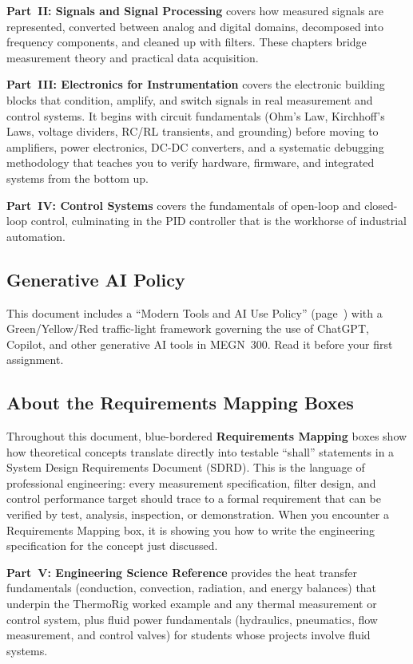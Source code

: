 \documentclass[11pt,letterpaper,twoside,openany]{book}
\begin{document}
\textbf{Part~II: Signals and Signal Processing} covers how measured signals are represented, converted between analog and digital domains, decomposed into frequency components, and cleaned up with filters. These chapters bridge measurement theory and practical data acquisition.

\textbf{Part~III: Electronics for Instrumentation} covers the electronic building blocks that condition, amplify, and switch signals in real measurement and control systems. It begins with circuit fundamentals (Ohm's Law, Kirchhoff's Laws, voltage dividers, RC/RL transients, and grounding) before moving to amplifiers, power electronics, DC-DC converters, and a systematic debugging methodology that teaches you to verify hardware, firmware, and integrated systems from the bottom up.

\textbf{Part~IV: Control Systems} covers the fundamentals of open-loop and closed-loop control, culminating in the PID controller that is the workhorse of industrial automation.


\subsection*{Generative AI Policy}
This document includes a ``Modern Tools and AI Use Policy'' (page~\pageref{ch:aipolicy}) with a Green/Yellow/Red traffic-light framework governing the use of ChatGPT, Copilot, and other generative AI tools in MEGN~300. Read it before your first assignment.

\subsection*{About the Requirements Mapping Boxes}
Throughout this document, blue-bordered \textbf{Requirements Mapping} boxes show how theoretical concepts translate directly into testable ``shall'' statements in a System Design Requirements Document (SDRD). This is the language of professional engineering: every measurement specification, filter design, and control performance target should trace to a formal requirement that can be verified by test, analysis, inspection, or demonstration. When you encounter a Requirements Mapping box, it is showing you how to write the engineering specification for the concept just discussed.

\textbf{Part~V: Engineering Science Reference} provides the heat transfer fundamentals (conduction, convection, radiation, and energy balances) that underpin the ThermoRig worked example and any thermal measurement or control system, plus fluid power fundamentals (hydraulics, pneumatics, flow measurement, and control valves) for students whose projects involve fluid systems.
\end{document}
